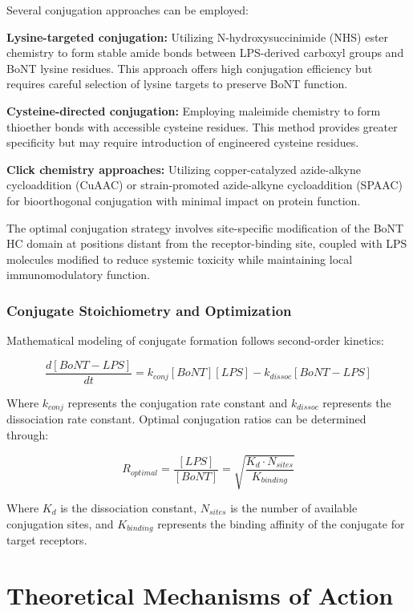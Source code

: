 \documentclass[11pt,a4paper]{article}
\begin{document}
Several conjugation approaches can be employed:

\textbf{Lysine-targeted conjugation:} Utilizing N-hydroxysuccinimide (NHS) ester chemistry to form stable amide bonds between LPS-derived carboxyl groups and BoNT lysine residues. This approach offers high conjugation efficiency but requires careful selection of lysine targets to preserve BoNT function.

\textbf{Cysteine-directed conjugation:} Employing maleimide chemistry to form thioether bonds with accessible cysteine residues. This method provides greater specificity but may require introduction of engineered cysteine residues.

\textbf{Click chemistry approaches:} Utilizing copper-catalyzed azide-alkyne cycloaddition (CuAAC) or strain-promoted azide-alkyne cycloaddition (SPAAC) for bioorthogonal conjugation with minimal impact on protein function.

The optimal conjugation strategy involves site-specific modification of the BoNT HC domain at positions distant from the receptor-binding site, coupled with LPS molecules modified to reduce systemic toxicity while maintaining local immunomodulatory function.

\subsubsection{Conjugate Stoichiometry and Optimization}

Mathematical modeling of conjugate formation follows second-order kinetics:

\begin{equation}
\frac{d[BoNT-LPS]}{dt} = k_{conj}[BoNT][LPS] - k_{dissoc}[BoNT-LPS]
\end{equation}

Where $k_{conj}$ represents the conjugation rate constant and $k_{dissoc}$ represents the dissociation rate constant. Optimal conjugation ratios can be determined through:

\begin{equation}
R_{optimal} = \frac{[LPS]}{[BoNT]} = \sqrt{\frac{K_d \cdot N_{sites}}{K_{binding}}}
\end{equation}

Where $K_d$ is the dissociation constant, $N_{sites}$ is the number of available conjugation sites, and $K_{binding}$ represents the binding affinity of the conjugate for target receptors.

\section{Theoretical Mechanisms of Action}
\end{document}
